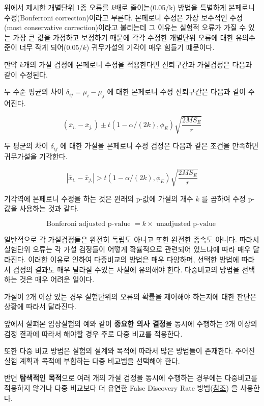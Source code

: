 \documentclass[
  10pt,
]{book}
\makeatletter
\newenvironment{kframe}{%
\medskip{}
\setlength{\fboxsep}{.8em}
 \def\at@end@of@kframe{}%
 \ifinner\ifhmode%
  \def\at@end@of@kframe{\end{minipage}}%
  \begin{minipage}{\columnwidth}%
 \fi\fi%
 \def\FrameCommand##1{\hskip\@totalleftmargin \hskip-\fboxsep
 \colorbox{shadecolor}{##1}\hskip-\fboxsep
     \hskip-\linewidth \hskip-\@totalleftmargin \hskip\columnwidth}%
 \MakeFramed {\advance\hsize-\width
   \@totalleftmargin\z@ \linewidth\hsize
   \@setminipage}}%
 {\par\unskip\endMakeFramed%
 \at@end@of@kframe}
\newenvironment{rmdblock}[1]
  {
  \begin{itemize}
  \renewcommand{\labelitemi}{
    \raisebox{-.7\height}[0pt][0pt]{
      {\setkeys{Gin}{width=3em,keepaspectratio}\texttt{[image: images/\#1]}}
    }
  }
  \setlength{\fboxsep}{1em}
  \begin{kframe}
  \item
  }
  {
  \end{kframe}
  \end{itemize}
  }
\newenvironment{rmdnote}
  {\begin{rmdblock}{note}}
  {\end{rmdblock}}
\theoremstyle{definition}
\theoremstyle{definition}
\theoremstyle{definition}
\theoremstyle{definition}
\theoremstyle{remark}
\makeatother
\begin{document}
위에서 제시한 개별단위 1종 오류를 \(k\)배로 줄이는(0.05/k) 방법을 특별하게
본페로니 수정(Bonferroni correction)이라고 부른다. 본페로니 수정은 가장
보수적인 수정(most conservative correction)이라고 불리는데 그 이유는
실험적 오류가 가질 수 있는 가장 큰 값을 가정하고 보정하기 때문에 각각
수정한 개별단위 오류에 대한 유의수준이 너무 작게 되어(\(0.05/k\))
귀무가설의 기각이 매우 힘들기 떄문이다.

만약 \(k\)개의 가설 검정에 본페로니 수정을 적용한다면 신뢰구간과
가설검정은 다음과 같이 수정된다.

두 수준 평균의 차이 \(\delta_{ij} = \mu_i - \mu_j\) 에 대한 본페로니 수정
신뢰구간은 다음과 같이 주어진다.

\begin{equation}
( \bar {x}_{i.} - \bar {x}_{j.})   \pm t(1-\alpha/(2k), \phi_E) \sqrt{ \frac{2MS_E}{r}} 
\label{eq:twomeancibon}
\end{equation}

두 평균의 차이 \(\delta_{ij}\) 에 대한 가설을 본페로니 수정 검정은 다음과
같은 조건을 만족하면 귀무가설을 기각한다.

\begin{equation}
 \left | \bar {x}_{i.} - \bar {x}_{j.} \right | > t(1-\alpha/(2k), \phi_E) \sqrt{ \frac{2MS_E}{r}} 
\label{eq:lsdbon}
\end{equation}

기각역에 본페로니 수정을 하는 것은 윈래의 p-값에 가설의 개수 \(k\) 를
곱하여 수정 p-값을 사용하는 것과 같다.

\begin{equation}
   \text{Bonferoni adjusted p-value } = k 
   \times \text{ unadjusted p-value } 
\label{eq:pbon}
\end{equation}

일반적으로 각 가설검정들은 완전히 독립도 아니고 또한
완전한 종속도 아니다. 따라서 실험단위 오류는 각 가설 검정들이 어떻게
확률적으로 관련되어 있느냐에 따라 매우 달라진다. 이러한 이유로 인하여
다중비교의 방법은 매우 다양하며, 선택한 방법에 따라서 검정의 결과도 매우
달라질 수있는 사실에 유의해야 한다. 다중비교의 방법을 선택하는 것은 매우
어려운 일이다.

\begin{rmdnote}
가설이 2개 이상 있는 경우 실험단위의 오류의 확률을 제어해야 하는지에 대한 판단은
상황에 따라서 달라진다.

앞에서 살펴본 임상실험의 예와 같이 \textbf{중요한 의사 결정}을 동시에 수행하는 2개 이상의
검정 결과에 따라서 해야할 경우 주로 다중 비교를 적용한다.

또한 다중 비교 방법은 실험의 설계와 목적에 따라서 많은 방법들이 존재한다. 주어진 실험 계획과 목적에 부합하는 다중 비교법을 선택해야 한다.

반면 \textbf{탐색적인 목적}으로 여러 개의 가설 검정을 동시에 수행하는 경우에는 다중비교를 적용하지 않거나
다중 비교보다 더 유연한 False Discovery Rate 방법(\href{https://en.wikipedia.org/wiki/False_discovery_rate}{참조})
을 사용한다.
\end{rmdnote}
\end{document}
